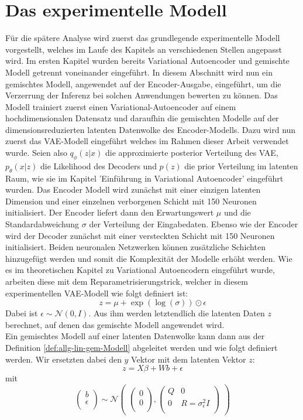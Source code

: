 \documentclass[%
thesis=student,%
coverpage=false,%
titlepage=false,%
headmarks=true, %
german,%
font=libertine, %
math=newpxtx, %
BCOR=5mm,%
coverBCOR=11mm%
]{tumbook}
\theoremstyle{break}
\begin{document}
\section{Das experimentelle Modell}
Für die spätere Analyse wird zuerst das grundlegende experimentelle Modell vorgestellt, welches im Laufe des Kapitels an verschiedenen Stellen angepasst wird. 
Im ersten Kapitel wurden bereits Variational Autoencoder und gemischte Modell getrennt voneinander eingeführt. In diesem Abschnitt wird nun ein gemischtes Modell, angewendet auf der Encoder-Ausgabe, eingeführt, um die Verzerrung der Inferenz bei solchen Anwendungen bewerten zu können. Das Modell trainiert zuerst einen Variational-Autoencoder auf einem hochdimensionalen Datensatz und daraufhin die gemischten Modelle auf der dimensionsreduzierten latenten Datenwolke des Encoder-Modells. Dazu wird nun zuerst das VAE-Modell eingeführt welches im Rahmen dieser Arbeit verwendet wurde. Seien also $q_\phi(z|x)$ die approximierte posterior Verteilung des VAE, $p_\theta(x|z)$ die Likelihood des Decoders und $p(z)$ die prior Verteilung im latenten Raum, wie sie im Kapitel 'Einführung in Variational Autoencoder' eingeführt wurden. Das Encoder Modell wird zunächst mit einer einzigen latenten Dimension und einer einzelnen verborgenen Schicht mit 150 Neuronen initialisiert. Der Encoder liefert dann den Erwartungswert $\mu$ und die Standardabweichung $\sigma$ der Verteilung der Eingabedaten. Ebenso wie der Encoder wird der Decoder zunächst mit einer versteckten Schicht mit 150 Neuronen initialisiert. Beiden neuronalen Netzwerken können zusätzliche Schichten hinzugefügt werden und somit die Komplexität der Modelle erhöht werden. 
Wie es im theoretischen Kapitel zu Variational Autoencodern eingeführt wurde, arbeiten diese mit dem Reparametrisierungstrick, welcher in diesem experimentellen VAE-Modell wie folgt definiert ist:
$$z = \mu + \exp(\log(\sigma)) \odot \epsilon$$  Dabei ist $\epsilon \sim \mathcal{N}(0,I)$. Aus ihm werden letztendlich die latenten Daten $z$ berechnet, auf denen das gemischte Modell angewendet wird.\\
Ein gemischtes Modell auf einer latenten Datenwolke kann dann aus der Definition \ref{def:allg-lin-gem-Modell} abgeleitet werden und wie folgt definiert werden. Wir ersetzten dabei den $y$ Vektor mit dem latenten Vektor $z$:
$$z = X\beta + Wb + \epsilon $$ \label{MM-auf-latentData}
mit
$$\begin{pmatrix}
		b \\
		\epsilon \\
\end{pmatrix}
\sim
\mathcal{N}
\begin{pmatrix}
\begin{pmatrix}		
	0 \\
	0 \\
\end{pmatrix},
\begin{pmatrix}
	Q & 0 \\
	0 & R = \sigma_\epsilon^2I \\
\end{pmatrix}
\end{pmatrix}$$
\end{document}
